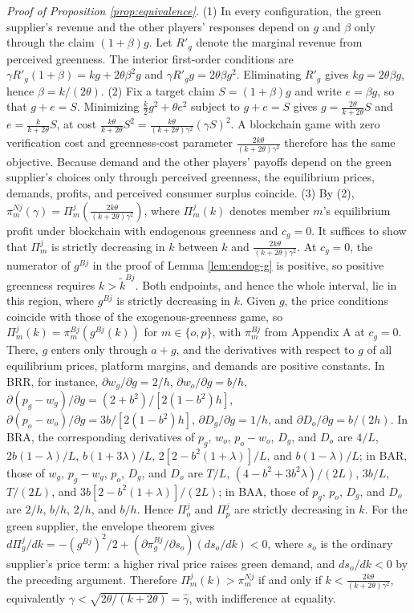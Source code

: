 \documentclass[preprint,review,12pt,authoryear,nopreprintline]{elsarticle}
\theoremstyle{definition}
\begin{document}
\noindent \textit{Proof of Proposition \ref{prop:equivalence}.}
(1) In every configuration, the green supplier's revenue and the other players' responses depend on $g$ and $\beta$ only through the claim $(1+\beta)g$. Let $R'_g$ denote the marginal revenue from perceived greenness. The interior first-order conditions are $\gamma R'_g(1+\beta)=kg+2\theta\beta^2g$ and $\gamma R'_g g=2\theta\beta g^2$. Eliminating $R'_g$ gives $kg=2\theta\beta g$, hence $\beta=k/(2\theta)$.
(2) Fix a target claim $S=(1+\beta)g$ and write $e=\beta g$, so that $g+e=S$. Minimizing $\frac{k}{2}g^2+\theta e^2$ subject to $g+e=S$ gives $g=\frac{2\theta}{k+2\theta}S$ and $e=\frac{k}{k+2\theta}S$, at cost $\frac{k\theta}{k+2\theta}S^2=\frac{k\theta}{(k+2\theta)\gamma^2}(\gamma S)^2$. A blockchain game with zero verification cost and greenness-cost parameter $\frac{2k\theta}{(k+2\theta)\gamma^2}$ therefore has the same objective. Because demand and the other players' payoffs depend on the green supplier's choices only through perceived greenness, the equilibrium prices, demands, profits, and perceived consumer surplus coincide.
(3) By (2), $\pi_m^{Nj}(\gamma)=\Pi_m^j\!\left(\frac{2k\theta}{(k+2\theta)\gamma^2}\right)$, where $\Pi_m^j(k)$ denotes member $m$'s equilibrium profit under blockchain with endogenous greenness and $c_g=0$. It suffices to show that $\Pi_m^j$ is strictly decreasing in $k$ between $k$ and $\frac{2k\theta}{(k+2\theta)\gamma^2}$. At $c_g=0$, the numerator of $g^{Bj}$ in the proof of Lemma \ref{lem:endog-g} is positive, so positive greenness requires $k>\tilde{k}^{Bj}$. Both endpoints, and hence the whole interval, lie in this region, where $g^{Bj}$ is strictly decreasing in $k$. Given $g$, the price conditions coincide with those of the exogenous-greenness game, so $\Pi_m^j(k)=\pi_m^{Bj}(g^{Bj}(k))$ for $m\in\{o,p\}$, with $\pi_m^{Bj}$ from Appendix A at $c_g=0$. There, $g$ enters only through $a+g$, and the derivatives with respect to $g$ of all equilibrium prices, platform margins, and demands are positive constants. In BRR, for instance, $\partial w_g/\partial g=2/h$, $\partial w_o/\partial g=b/h$, $\partial(p_g-w_g)/\partial g=(2+b^2)/[2(1-b^2)h]$, $\partial(p_o-w_o)/\partial g=3b/[2(1-b^2)h]$, $\partial D_g/\partial g=1/h$, and $\partial D_o/\partial g=b/(2h)$. In BRA, the corresponding derivatives of $p_g$, $w_o$, $p_o-w_o$, $D_g$, and $D_o$ are $4/L$, $2b(1-\lambda)/L$, $b(1+3\lambda)/L$, $2[2-b^2(1+\lambda)]/L$, and $b(1-\lambda)/L$; in BAR, those of $w_g$, $p_g-w_g$, $p_o$, $D_g$, and $D_o$ are $T/L$, $(4-b^2+3b^2\lambda)/(2L)$, $3b/L$, $T/(2L)$, and $3b[2-b^2(1+\lambda)]/(2L)$; in BAA, those of $p_g$, $p_o$, $D_g$, and $D_o$ are $2/h$, $b/h$, $2/h$, and $b/h$. Hence $\Pi_o^j$ and $\Pi_p^j$ are strictly decreasing in $k$. For the green supplier, the envelope theorem gives $d\Pi_g^j/dk=-(g^{Bj})^2/2+(\partial\pi_g^{Bj}/\partial s_o)(ds_o/dk)<0$, where $s_o$ is the ordinary supplier's price term: a higher rival price raises green demand, and $ds_o/dk<0$ by the preceding argument. Therefore $\Pi_m^j(k)>\pi_m^{Nj}$ if and only if $k<\frac{2k\theta}{(k+2\theta)\gamma^2}$, equivalently $\gamma<\sqrt{2\theta/(k+2\theta)}=\hat{\gamma}$, with indifference at equality.
\end{document}
